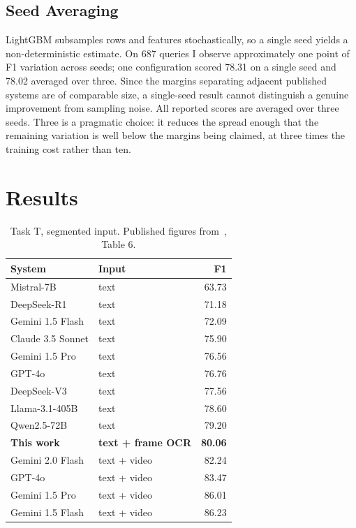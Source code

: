 \documentclass[conference]{IEEEtran}
\begin{document}
\subsection{Seed Averaging}

LightGBM subsamples rows and features stochastically, so a single seed yields a
non-deterministic estimate. On 687 queries I observe approximately one point of
F1 variation across seeds; one configuration scored 78.31 on a single seed and
78.02 averaged over three. Since the margins separating adjacent published
systems are of comparable size, a single-seed result cannot distinguish a
genuine improvement from sampling noise. All reported scores are averaged over
three seeds. Three is a pragmatic choice: it reduces the spread enough that the
remaining variation is well below the margins being claimed, at three times the
training cost rather than ten.

\section{Results}

\begin{table}[htbp]
\caption{Task T, segmented input. Published figures from~\cite{videoconviction},
Table 6.}
\label{tab:results}
\centering
\begin{tabular}{llr}
\toprule
System & Input & F1 \\
\midrule
Mistral-7B & text & 63.73 \\
DeepSeek-R1 & text & 71.18 \\
Gemini 1.5 Flash & text & 72.09 \\
Claude 3.5 Sonnet & text & 75.90 \\
Gemini 1.5 Pro & text & 76.56 \\
GPT-4o & text & 76.76 \\
DeepSeek-V3 & text & 77.56 \\
Llama-3.1-405B & text & 78.60 \\
Qwen2.5-72B & text & 79.20 \\
\midrule
\textbf{This work} & \textbf{text + frame OCR} & \textbf{80.06} \\
\midrule
Gemini 2.0 Flash & text + video & 82.24 \\
GPT-4o & text + video & 83.47 \\
Gemini 1.5 Pro & text + video & 86.01 \\
Gemini 1.5 Flash & text + video & 86.23 \\
\bottomrule
\end{tabular}
\end{table}
\end{document}
